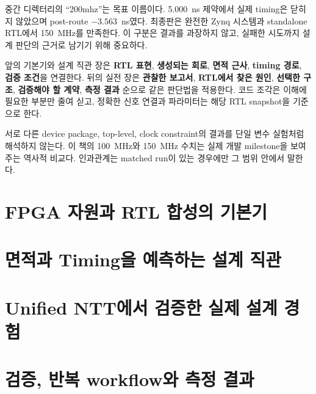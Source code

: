 \documentclass[11pt,a4paper,openany]{report}
\newcommand{\wns}{\ensuremath{\mathrm{WNS}}}
\begin{document}
중간 디렉터리의 ``200mhz''는 목표 이름이다. 5.000~ns 제약에서 실제 timing은
닫히지 않았으며 post-route  $-3.563$~ns였다. 최종판은 완전한 Zynq
시스템과 standalone RTL에서 150~MHz를 만족한다. 이 구분은 결과를 과장하지
않고, 실패한 시도까지 설계 판단의 근거로 남기기 위해 중요하다.

앞의 기본기와 설계 직관 장은 \textbf{RTL 표현}, \textbf{생성되는 회로},
\textbf{면적 근사}, \textbf{timing 경로}, \textbf{검증 조건}을 연결한다.
뒤의 실전 장은 \textbf{관찰한 보고서}, \textbf{RTL에서 찾은 원인},
\textbf{선택한 구조}, \textbf{검증해야 할 계약}, \textbf{측정 결과} 순으로
같은 판단법을 적용한다. 코드 조각은 이해에 필요한 부분만 줄여 싣고, 정확한
신호 연결과 파라미터는 해당 RTL snapshot을 기준으로 한다.

\begin{warningbox}[수치 해석 원칙]
서로 다른 device package, top-level, clock constraint의 결과를 단일 변수
실험처럼 해석하지 않는다. 이 책의 100~MHz와 150~MHz 수치는 실제 개발
milestone을 보여 주는 역사적 비교다. 인과관계는 matched run이 있는 경우에만
그 범위 안에서 말한다.
\end{warningbox}

\tableofcontents
\newpage
\hypersetup{pageanchor=true}
\setcounter{page}{1}

\part{FPGA 자원과 RTL 합성의 기본기}






\part{면적과 Timing을 예측하는 설계 직관}





\part{Unified NTT에서 검증한 실제 설계 경험}







\part{검증, 반복 workflow와 측정 결과}




\appendix


\end{document}

